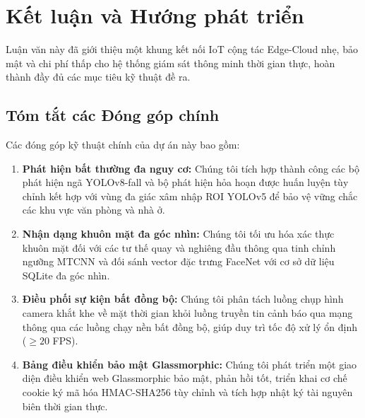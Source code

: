 \documentclass[12pt,a4paper]{article}
\begin{document}
\newpage

\section{Kết luận và Hướng phát triển}

Luận văn này đã giới thiệu một khung kết nối IoT cộng tác Edge-Cloud nhẹ, bảo mật và chi phí thấp cho hệ thống giám sát thông minh thời gian thực, hoàn thành đầy đủ các mục tiêu kỹ thuật đề ra.

\subsection{Tóm tắt các Đóng góp chính}
Các đóng góp kỹ thuật chính của dự án này bao gồm:
\begin{enumerate}
    \item \textbf{Phát hiện bất thường đa nguy cơ:} Chúng tôi tích hợp thành công các bộ phát hiện ngã YOLOv8-fall và bộ phát hiện hỏa hoạn được huấn luyện tùy chỉnh kết hợp với vùng đa giác xâm nhập ROI YOLOv5 để bảo vệ vững chắc các khu vực văn phòng và nhà ở.
    \item \textbf{Nhận dạng khuôn mặt đa góc nhìn:} Chúng tôi tối ưu hóa xác thực khuôn mặt đối với các tư thế quay và nghiêng đầu thông qua tinh chỉnh ngưỡng MTCNN và đối sánh vector đặc trưng FaceNet với cơ sở dữ liệu SQLite đa góc nhìn.
    \item \textbf{Điều phối sự kiện bất đồng bộ:} Chúng tôi phân tách luồng chụp hình camera khắt khe về mặt thời gian khỏi luồng truyền tin cảnh báo qua mạng thông qua các luồng chạy nền bất đồng bộ, giúp duy trì tốc độ xử lý ổn định ($\ge 20$ FPS).
    \item \textbf{Bảng điều khiển bảo mật Glassmorphic:} Chúng tôi phát triển một giao diện điều khiển web Glassmorphic bảo mật, phản hồi tốt, triển khai cơ chế cookie ký mã hóa HMAC-SHA256 tùy chỉnh và tích hợp nhật ký tài nguyên biên thời gian thực.
\end{enumerate}
\end{document}

